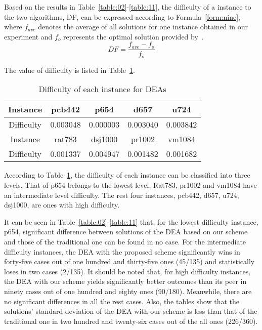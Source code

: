 \documentclass[journal,onecolumn]{IEEEtran}
\begin{document}
Based on the results in Table~\ref{table:02}-\ref{table:11}, the difficulty of a instance to the two algorithms, DF, can be expressed according to Formula~\ref{form:nine}, where $f_{ave}$ denotes the average of all solutions for one instance obtained in our experiment and $f_o$ represents the optimal solution provided by~\cite{reinelt1991tsplib}.
\begin{equation}
 DF = \frac{f_{ave}-f_o}{f_o}
\label{form:nine}
\end{equation}

The value of difficulty is listed in Table~\ref{table:12}.
\begin{table}[!htbp]
  \centering
  \caption{Difficulty of each instance for DEAs}
  \label{table:12}
  \begin{tabular}{|c|c|c|c|c|}
     \hline
   Instance &pcb442	&p654	&d657	&u724	\\
    \hline
    Difficulty &0.003048 	&0.000003 	&0.003040 	&0.003842  \\
    \hline
   Instance &rat783	&dsj1000	&pr1002	&vm1084 \\
    \hline
    Difficulty &0.001337 	&0.004947 	&0.001482 	&0.001682 \\
     \hline
  \end{tabular}
\end{table}
According to Table~\ref{table:12}, the difficulty of each instance can be classified into three levels.
That of p654 belongs to the lowest level.
Rat783, pr1002 and vm1084 have an intermediate level difficulty.
The rest four instances, pcb442, d657, u724, dsj1000, are ones with high difficulty.

It can be seen in Table~\ref{table:02}-\ref{table:11} that, for the lowest difficulty instance, p654, significant difference between solutions of the DEA based on our scheme and those of the traditional one can be found in no case.
For the intermediate difficulty instances, the DEA with the proposed scheme significantly wins in forty-five cases out of one hundred and thirty-five ones (45/135) and statistically loses in two cases (2/135).
It should be noted that, for high difficulty instances, the DEA with our scheme yields significantly better outcomes than its peer in ninety cases out of one hundred and eighty ones (90/180).
Meanwhile, there are no significant differences in all the rest cases.
Also, the tables show that the solutions' standard deviation of the DEA with our scheme is less than that of the traditional one in two hundred and twenty-six cases out of the all ones (226/360).
\end{document}
